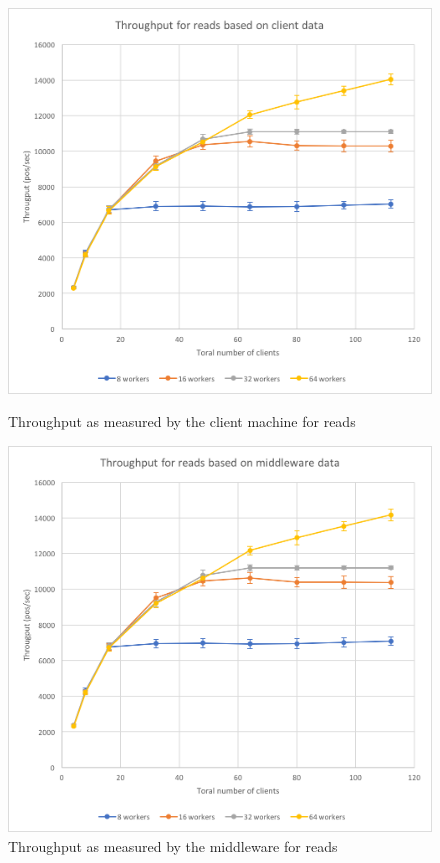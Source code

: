 \documentclass[11pt,a4paper]{article}
\begin{document}
\begin{figure}[!h]
    \centering
    \begin{minipage}[b]{.45\textwidth}
        \centering
        \includegraphics[width=\textwidth]{processing/graphics/bench_1mw_through-clients_read_cdat.png}
        \caption{Throughput as measured by the client machine for reads}
        \label{png::bench_1mw_through-clients_read_cdat}
    \end{minipage}
    \qquad
    \begin{minipage}[b]{.45\textwidth}
        \centering
        \includegraphics[width=\textwidth]{processing/graphics/bench_1mw_through-clients_read_mdat.png}
        \caption{Throughput as measured by the middleware for reads}
        \label{png::bench_1mw_through-clients_read_mdat}
    \end{minipage}
\end{figure}
\end{document}
